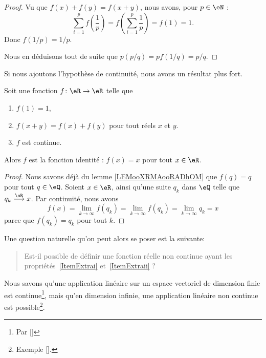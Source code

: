 \begin{proof}
    Vu que \( f(x)+f(y)=f(x+y)\), nous avons, pour \( p\in \eN\) :
    \begin{equation}
        \sum_{i=1}^pf(\frac{1}{ p })=f(\sum_{i=1}^p\frac{1}{ p })=f(1)=1.
    \end{equation}
    Donc \( f(1/p)=1/p\).

    Nous en déduisons tout de suite que \( p(p/q)=pf(1/q)=p/q\).
\end{proof}


Si nous ajoutons l'hypothèse de continuité, nous avons un résultat plus fort.
\begin{lemma}        \label{LEMooYKCUooUiIvPJ}
    Soit une fonction \( f\colon \eR\to \eR\) telle que
    \begin{enumerate}

        \item		\label{ItemExtrai}
            \( f(1)=1\),

        \item		\label{ItemExtraii}
            \( f(x+y)=f(x)+f(y)\) pour tout réels \( x\) et \( y\).
        \item
            \( f\) est continue.
    \end{enumerate}
    Alors \( f\) est la fonction identité : \( f(x)=x\) pour tout \( x\in \eR\).
\end{lemma}

\begin{proof}
    Nous savons déjà du lemme \ref{LEMooXRMAooRADhOM} que \( f(q)=q\) pour tout \( q\in \eQ\). Soient \( x\in \eR\), ainsi qu'une suite \( q_k\) dans \( \eQ\) telle que \( q_k\stackrel{\eR}{\longrightarrow}x\). Par continuité, nous avons 
    \begin{equation}
        f(x)=\lim_{k\to \infty} f(q_k)= \lim_{k\to \infty} f(q_k)=\lim_{k\to \infty} q_k=x
    \end{equation}
    parce que \( f(q_k)=q_k\) pour tout \( k\).
\end{proof}

Une question naturelle qu'on peut alors se poser est la suivante:
\begin{quote}
	Est-il possible de définir une fonction réelle non continue ayant les propriétés~\ref{ItemExtrai} et~\ref{ItemExtraii} ?
\end{quote}

Nous savons qu'une application linéaire sur un espace vectoriel de dimension finie est continue\footnote{Par \ref{}}, mais qu'en dimension infinie, une application linéaire non continue est possible\footnote{Exemple \ref{}.}.

